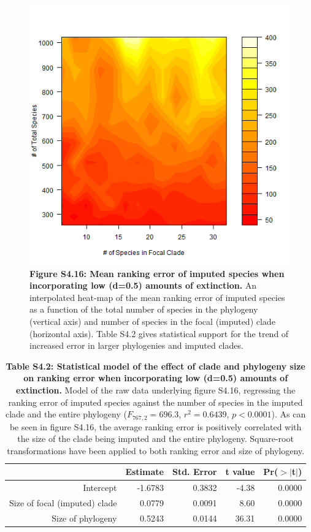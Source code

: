 \documentclass[10pt,english]{article}
\begin{document}
\begin{figure}[!ht]
  \center
  \includegraphics[width=.5\textwidth]{../figures/rankingErrorLowExtinction.png}
  \caption{\textbf{Figure S4.16: Mean ranking error of imputed species when
  incorporating low (d=0.5) amounts of extinction.} An interpolated heat-map of
  the mean ranking error of imputed species as a function of the total number of
  species in the phylogeny (vertical axis) and number of species in the focal
  (imputed) clade (horizontal axis). Table S4.2 gives statistical support for
  the trend of increased error in larger phylogenies and imputed clades.}
\end{figure}

\begin{table}[ht]
  \centering
  \begin{tabular}{rrrrr}
    \hline
   & Estimate & Std. Error & t value & Pr($>$$|$t$|$) \\ \hline
   Intercept & -1.6783 & 0.3832 & -4.38 & 0.0000 \\
   Size of focal (imputed) clade & 0.0779 & 0.0091 & 8.60 & 0.0000 \\
   Size of phylogeny & 0.5243 & 0.0144 & 36.31 & 0.0000 \\ \hline
  \end{tabular}
  \caption{\textbf{Table S4.2: Statistical model of the effect of clade and
      phylogeny size on ranking error when incorporating low (d=0.5) amounts of
      extinction.} Model of the raw data underlying figure S4.16, regressing the
      ranking error of imputed species against the number of species in the
      imputed clade and the entire phylogeny ($F_{767,2} = 696.3$, $r^2 =
      0.6439$, $p < 0.0001$). As can be seen in figure S4.16, the average
      ranking error is positively correlated with the size of the clade being
      imputed and the entire phylogeny. Square-root transformations have been
      applied to both ranking error and size of phylogeny.}
\end{table}
\end{document}
